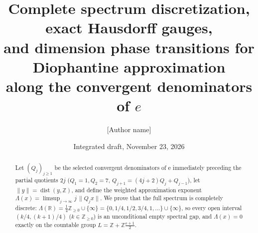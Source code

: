 \documentclass[11pt]{article}
\title{Complete spectrum discretization, exact Hausdorff gauges,\\
and dimension phase transitions for Diophantine approximation\\
along the convergent denominators of \texorpdfstring{$e$}{e}}
\author{[Author name]\\ \relax[Affiliation]}
\date{Integrated draft, November 23, 2026}
\theoremstyle{definition}
\theoremstyle{remark}
\newcommand{\R}{\mathbb{R}}
\newcommand{\Z}{\mathbb{Z}}
\newcommand{\ee}{\mathrm{e}}
\newcommand{\dist}{\operatorname{dist}}
\newcommand{\Lam}{\Lambda}
\begin{document}
\maketitle

\begin{abstract}
Let $(Q_j)_{j\ge1}$ be the selected convergent denominators of $\ee$
immediately preceding the partial quotients $2j$
($Q_1=1,Q_2=7$, $Q_{j+1}=(4j+2)Q_j+Q_{j-1}$), let $\|y\|=\dist(y,\Z)$, and
define the weighted approximation exponent
$\Lam(x)=\limsup_{j\to\infty} j\,\|Q_j x\|$. We prove that the full spectrum is
completely discrete:
$\Lam(\R)=\frac14\Z_{\ge0}\cup\{\infty\}=\{0,1/4,1/2,3/4,1,\dots\}\cup\{\infty\}$,
so every open interval $(k/4,(k+1)/4)$ ($k\in\Z_{\ge0}$) is an unconditional
empty spectral gap, and $\Lam(x)=0$ exactly on the countable group
$L=\Z+\Z\frac{\ee+1}{2}$.


\end{abstract}
\end{document}
